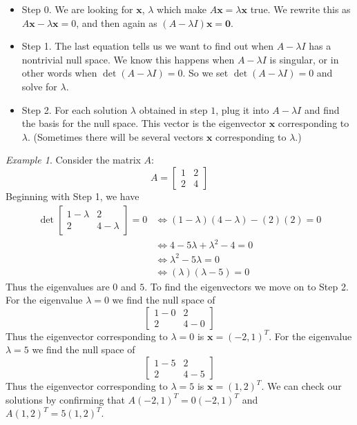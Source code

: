 \documentclass[11pt,oneside]{amsbook}
\theoremstyle{definition}
\theoremstyle{plain}
\theoremstyle{definition}
\theoremstyle{remark}
\newtheorem{example}[theorem]{Example}
\numberwithin{equation}{section}
\numberwithin{figure}{section}
\begin{document}
\begin{itemize}
  \item Step 0. We are looking for $\mathbf{x}$, $\lambda$ which make $A\mathbf{x}=\lambda\mathbf{x}$ true. We rewrite this as $A\mathbf{x}-\lambda\mathbf{x}=0$, and then again as $(A-\lambda I)\mathbf{x}=\mathbf{0}$.
  \item Step 1. The last equation tells us we want to find out when $A-\lambda I$ has a nontrivial null space. We know this happens when $A-\lambda I$ is singular, or in other words when $\det(A-\lambda I)=0$. So we set $\det(A-\lambda I)=0$ and solve for $\lambda$.
  \item Step 2. For each solution $\lambda$ obtained in step $1$, plug it into $A-\lambda I$ and find the basis for the null space. This vector is the eigenvector $\mathbf{x}$ corresponding to $\lambda$. (Sometimes there will be several vectors $\mathbf{x}$ corresponding to $\lambda$.)
\end{itemize}

\begin{example}
  Consider the matrix $A$:
  \[A=\begin{bmatrix}1&2\\2&4\end{bmatrix}
  \]
  Beginning with Step 1, we have
  \begin{align*}
    \det\begin{bmatrix}1-\lambda&2\\2&4-\lambda\end{bmatrix}=0
    &\iff (1-\lambda)(4-\lambda)-(2)(2)=0\\
    &\iff 4-5\lambda+\lambda^2-4=0\\
    &\iff \lambda^2-5\lambda=0\\
    &\iff (\lambda)(\lambda-5)=0
  \end{align*}
  Thus the eigenvalues are $0$ and $5$. To find the eigenvectors we move on to Step 2. For the eigenvalue $\lambda=0$ we find the null space of
  \[\begin{bmatrix}1-0&2\\2&4-0\end{bmatrix}
  \]
  Thus the eigenvector corresponding to $\lambda=0$ is $\mathbf{x}=(-2,1)^T$. For the eigenvalue $\lambda=5$ we find the null space of 
  \[\begin{bmatrix}1-5&2\\2&4-5\end{bmatrix}
  \]
  Thus the eigenvector corresponding to $\lambda=5$ is $\mathbf{x}=(1,2)^T$. We can check our solutions by confirming that $A(-2,1)^T=0(-2,1)^T$ and $A(1,2)^T=5(1,2)^T$.
\end{example}
  
\end{document}
